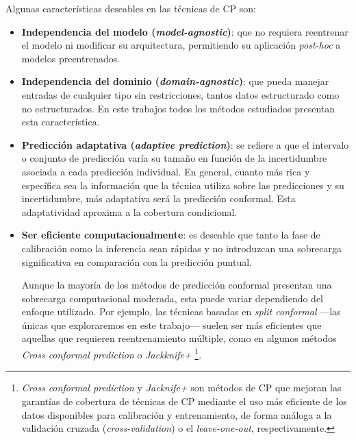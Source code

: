 Algunas características deseables en las técnicas de \acrshort{CP} son:

\begin{itemize}
    \item \textbf{Independencia del modelo (\textit{model-agnostic})}: que no requiera reentrenar el modelo ni modificar su arquitectura, permitiendo su aplicación \textit{post-hoc} a modelos preentrenados.

    \item \textbf{Independencia del dominio (\textit{domain-agnostic})}: que pueda manejar entradas de cualquier tipo sin restricciones, tantos datos estructurado como no estructurados. En este trabajos todos los métodos estudiados presentan esta característica.
     
    \item \textbf{Predicción adaptativa (\textit{adaptive prediction})}: se refiere a que el intervalo o conjunto de predicción varía su tamaño en función de la incertidumbre asociada a cada predicción individual. En general, cuanto más rica y específica sea la información que la técnica utiliza sobre las predicciones y su incertidumbre, más adaptativa será la predicción conformal.
    Esta adaptatividad aproxima a la cobertura condicional.

    \item \textbf{Ser eficiente computacionalmente}: es deseable que tanto la fase de calibración como la inferencia sean rápidas y no introduzcan una sobrecarga significativa en comparación con la predicción puntual.
    
    Aunque la mayoría de los métodos de predicción conformal presentan una sobrecarga computacional moderada, esta puede variar dependiendo del enfoque utilizado. Por ejemplo, las técnicas basadas en \textit{split conformal} ---las únicas que exploraremos en este trabajo--- suelen ser más eficientes que aquellas que requieren reentrenamiento múltiple, como en algunos métodos \textit{Cross conformal prediction} o \textit{Jackknife+}%
    \footnote{
        \textit{Cross conformal prediction} \cite{vovk2015} y \textit{Jacknife+} \cite{barber2021} son métodos de \acrshort{CP} que mejoran las garantías de cobertura de técnicas de \acrshort{CP} mediante el uso más eficiente de los datos disponibles para calibración y entrenamiento, de forma análoga a la validación cruzada (\textit{cross-validation}) o el \textit{leave-one-out}, respectivamente.
    }.
    

\end{itemize}

